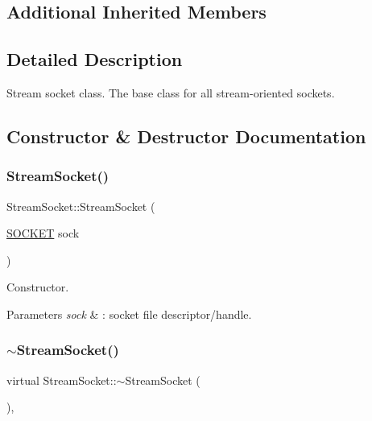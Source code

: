 \subsection*{Additional Inherited Members}


\subsection{Detailed Description}
Stream socket class. The base class for all stream-\/oriented sockets. 

\subsection{Constructor \& Destructor Documentation}
\mbox{\label{classStreamSocket_a5b84a10f7bece6175c0d885c3568aa4f}} 
\subsubsection{\texorpdfstring{Stream\+Socket()}{StreamSocket()}\hspace{0.1cm}{\footnotesize\ttfamily [1/3]}}
{\footnotesize\ttfamily Stream\+Socket\+::\+Stream\+Socket (\begin{DoxyParamCaption}\item[{\hyperlink{sockclasslib_8h_a8dc8083897335125630f1af5dafd5831}{S\+O\+C\+K\+ET}}]{sock }\end{DoxyParamCaption})}

Constructor. 
\begin{DoxyParams}{Parameters}
{\em sock} & \+: socket file descriptor/handle. \\
\hline
\end{DoxyParams}
\mbox{\label{classStreamSocket_ad19381c15cf7390ea3751d930b16c45e}} 
\subsubsection{\texorpdfstring{$\sim$\+Stream\+Socket()}{~StreamSocket()}}
{\footnotesize\ttfamily virtual Stream\+Socket\+::$\sim$\+Stream\+Socket (\begin{DoxyParamCaption}{ }\end{DoxyParamCaption})\hspace{0.3cm}{\ttfamily [inline]}, {\ttfamily [virtual]}}



